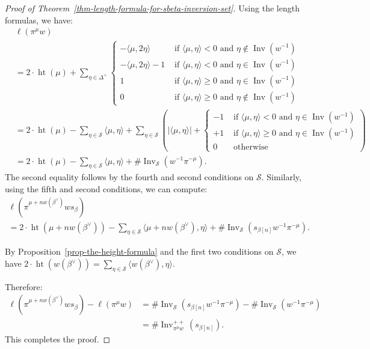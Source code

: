 \documentclass[ALCO,ThmDefs,Unicode]{cedram}
\DeclareMathOperator{\height}{ht}
\DeclareMathOperator{\Inv}{Inv}
\newcommand{\betacheck}{\beta^\vee}
\newcommand{\cS}{\mathcal{S}}
\newcommand{\textif}{\text{ if }}
\newcommand{\textand}{\text{ and }}
\begin{document}
\begin{proof}[Proof of Theorem~\ref{thm-length-formula-for-sbeta-inversion-set}]
Using the length formulas, we have:
\begin{align*}
&\ell(\pi^\mu w)\\ &= 2 \cdot \height(\mu) + \sum_{\eta \in\Delta^+}
\begin{cases}
- \langle \mu, 2 \eta \rangle & \textif \langle \mu, \eta \rangle < 0 \textand \eta \notin \Inv(w^{-1}) \\
- \langle \mu, 2 \eta \rangle -1 & \textif \langle \mu, \eta \rangle < 0 \textand \eta \in \Inv(w^{-1}) \\
1 & \textif \langle \mu, \eta \rangle \geq 0 \textand \eta \in \Inv(w^{-1}) \\
0 & \textif \langle \mu, \eta \rangle \geq 0 \textand \eta \notin \Inv(w^{-1})
\end{cases} \\
&= 2 \cdot \height(\mu) - \sum_{\eta \in \cS} \langle \mu, \eta \rangle +
\sum_{\eta \in \cS} \left(|\langle \mu, \eta \rangle| +
\begin{cases}
-1 & \textif \langle \mu, \eta \rangle < 0 \textand \eta \in \Inv(w^{-1}) \\
+1 & \textif \langle \mu, \eta \rangle \geq 0 \textand \eta \in \Inv(w^{-1}) \\
0 & \text{ otherwise}
\end{cases}
\right) \\
&= 2 \cdot \height(\mu) - \sum_{\eta \in \cS} \langle \mu, \eta \rangle + \# \Inv_{\cS}(w^{-1} \pi^{-\mu}).
\end{align*}
The second equality follows by the fourth and second conditions on $\cS$. Similarly, using the fifth and second conditions, we can compute:
\begin{multline}\label{eq:65H}
\ell(\pi^{\mu + n w(\betacheck)} w s_\beta)\\
 = 2 \cdot \height(\mu + n w(\betacheck)) - \sum_{\eta \in \cS}\langle \mu + n w(\betacheck), \eta \rangle + \# \Inv_{\cS}(s_{\beta[n]} w^{-1} \pi^{-\mu}).
\end{multline}

By Proposition~\ref{prop-the-height-formula} and the first two conditions on $\cS$, we have $2 \cdot \height(w(\betacheck)) = \sum_{\eta \in \cS} \langle w(\betacheck), \eta \rangle$.

Therefore:
\begin{align*}
\ell(\pi^{\mu + n w(\betacheck)} w s_\beta) - \ell(\pi^\mu w) &= \# \Inv_{\cS}(s_{\beta[n]}w^{-1} \pi^{-\mu}) - \# \Inv_{\cS}(w^{-1} \pi^{-\mu})\\
&= \# \Inv^{++}_{\pi^\mu w} (s_{\beta[n]}).
\end{align*}
This completes the proof.
\end{proof}
\end{document}
